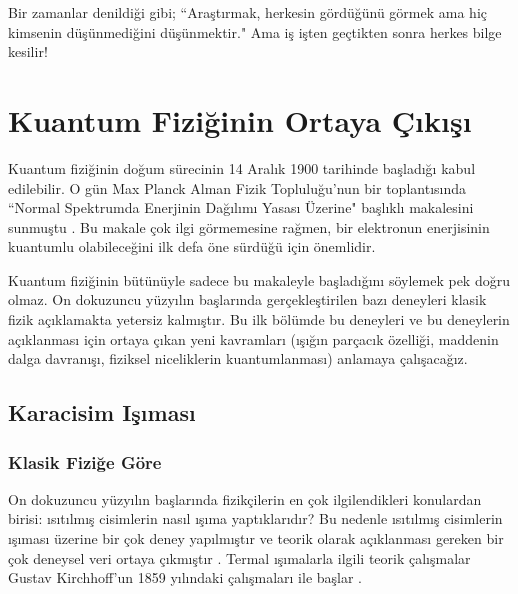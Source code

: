 \documentclass[00_kitap.tex]{subfiles}
\begin{document}
	\BolumKaynakcaBaslat

{
\hspace{.5\textwidth}
\begin{minipage}{.5\textwidth}
\raggedleft

Bir zamanlar denildiği gibi; ``Araştırmak, herkesin gördüğünü görmek ama hiç kimsenin düşünmediğini düşünmektir." Ama iş işten geçtikten sonra herkes bilge kesilir! \cite{book:Jammer}


\end{minipage}
}


\section{Kuantum Fiziğinin Ortaya Çıkışı}

Kuantum fiziğinin doğum sürecinin 14 Aralık 1900 tarihinde başladığı kabul edilebilir. O gün Max Planck Alman Fizik Topluluğu'nun bir toplantısında  ``Normal Spektrumda Enerjinin Dağılımı Yasası Üzerine" \cite{article:Planck} başlıklı makalesini sunmuştu \cite{book:EisbergResnick}. Bu makale çok ilgi görmemesine rağmen, bir elektronun enerjisinin kuantumlu olabileceğini ilk defa öne sürdüğü için önemlidir.

Kuantum fiziğinin bütünüyle sadece bu makaleyle başladığını söylemek pek doğru olmaz. On dokuzuncu yüzyılın başlarında gerçekleştirilen bazı deneyleri klasik fizik açıklamakta yetersiz kalmıştır. Bu ilk bölümde bu deneyleri ve bu deneylerin açıklanması için ortaya çıkan yeni kavramları (ışığın parçacık özelliği, maddenin dalga davranışı, fiziksel niceliklerin kuantumlanması) anlamaya çalışacağız. 


\subsection{Karacisim Işıması}



\subsubsection{Klasik Fiziğe Göre}
On dokuzuncu yüzyılın başlarında fizikçilerin en çok ilgilendikleri konulardan birisi:
ısıtılmış cisimlerin nasıl ışıma yaptıklarıdır? Bu nedenle ısıtılmış cisimlerin ışıması üzerine bir çok deney yapılmıştır ve teorik olarak açıklanması gereken bir çok deneysel veri ortaya çıkmıştır \cite{book:Sharkov}. Termal ışımalarla ilgili teorik çalışmalar Gustav Kirchhoff'un 1859 yılındaki çalışmaları ile başlar \cite{book:Gasiorowicz}. 
\end{document}
